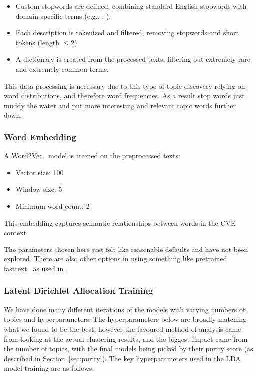 \begin{itemize}
	\item Custom stopwords are defined, combining standard English stopwords with domain-specific terms (e.g., , ).
	\item Each description is tokenized and filtered, removing stopwords and short tokens (length $\leq 2$).
	\item A dictionary is created from the processed texts, filtering out extremely rare and extremely common terms.
\end{itemize}


This data processing is necessary due to this type of topic discovery relying on word distributions, and therefore word frequencies. As a result stop words just muddy the water and put more interesting and relevant topic words further down.


\subsubsection{Word Embedding}

A Word2Vec~\cite{word2vec} model is trained on the preprocessed texts:

\begin{itemize}
	\item Vector size: 100
	\item Window size: 5
	\item Minimum word count: 2
\end{itemize}

This embedding captures semantic relationships between words in the CVE context.

The parameters chosen here just felt like reasonable defaults and have not been explored. There are also other options in using something like pretrained fasttext~\cite{fasttext} as used in \cite{nvd_clustering_fasttext}.


\subsubsection{Latent Dirichlet Allocation Training}

We have done many different iterations of the models with varying numbers of topics and hyperparameters. The hyperparameters below are broadly matching what we found to be the best, however the favoured method of analysis came from looking at the actual clustering results, and the biggest impact came from the number of topics, with the final models being picked by their purity score (as described in Section~\ref{sec:purity}). The key hyperparameters used in the LDA model training are as follows:

